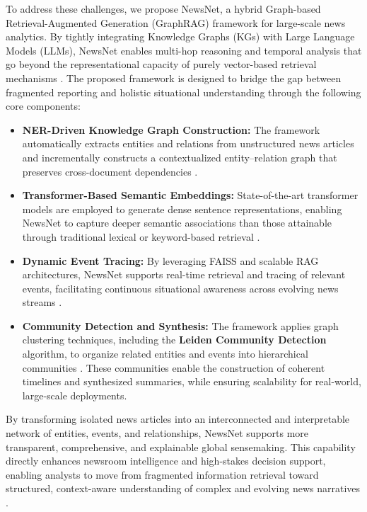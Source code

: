 \documentclass[preprint,10pt]{article}
\begin{document}
To address these challenges, we propose NewsNet, a hybrid Graph-based Retrieval-Augmented Generation (GraphRAG) framework for large-scale news analytics. By tightly integrating Knowledge Graphs (KGs) with Large Language Models (LLMs), NewsNet enables multi-hop reasoning and temporal analysis that go beyond the representational capacity of purely vector-based retrieval mechanisms \cite{BichTram2025, Mosolygo2025}. The proposed framework is designed to bridge the gap between fragmented reporting and holistic situational understanding through the following core components:

\begin{itemize}
\item \textbf{NER-Driven Knowledge Graph Construction:} The framework automatically extracts entities and relations from unstructured news articles and incrementally constructs a contextualized entity–relation graph that preserves cross-document dependencies \cite{Kim2025, BichTram2025}.
\item \textbf{Transformer-Based Semantic Embeddings:} State-of-the-art transformer models are employed to generate dense sentence representations, enabling NewsNet to capture deeper semantic associations than those attainable through traditional lexical or keyword-based retrieval \cite{Mosolygo2025, Myers2025}.
\item \textbf{Dynamic Event Tracing:} By leveraging FAISS and scalable RAG architectures, NewsNet supports real-time retrieval and tracing of relevant events, facilitating continuous situational awareness across evolving news streams \cite{Mosolygo2025, Haque2025}.
\item \textbf{Community Detection and Synthesis:} The framework applies graph clustering techniques, including the \textbf{Leiden Community Detection} algorithm, to organize related entities and events into hierarchical communities \cite{Kim2025, Edge2025}. These communities enable the construction of coherent timelines and synthesized summaries, while ensuring scalability for real-world, large-scale deployments.
\end{itemize}

By transforming isolated news articles into an interconnected and interpretable network of entities, events, and relationships, NewsNet supports more transparent, comprehensive, and explainable global sensemaking. This capability directly enhances newsroom intelligence and high-stakes decision support, enabling analysts to move from fragmented information retrieval toward structured, context-aware understanding of complex and evolving news narratives \cite{Mosolygo2025, Jimenez2025}.
\end{document}
